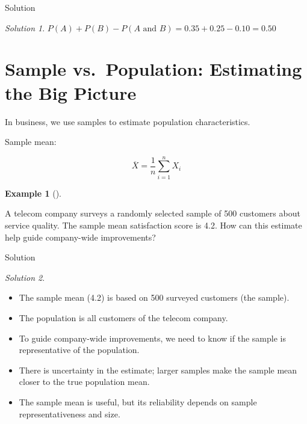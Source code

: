 \documentclass[
  12pt,
  letterpaper,
]{scrbook}
\providecommand{\tightlist}{%
  \setlength{\itemsep}{0pt}\setlength{\parskip}{0pt}}
\renewcommand{\tightlist}{\setlength{\itemsep}{0.5\baselineskip}\setlength{\parskip}{0.2\baselineskip}}
\theoremstyle{definition}
\newtheorem{example}{Example}[chapter]
\theoremstyle{plain}
\theoremstyle{remark}
\newtheorem{refsolution}{Solution}[chapter]
\begin{document}
Solution

\begin{refsolution}
\leavevmode

\(P(A) + P(B) - P(A \text{ and } B) = 0.35 + 0.25 - 0.10 = 0.50\)

\label{sol-2}

\end{refsolution}

\section{Sample vs.~Population: Estimating the Big
Picture}\label{sample-vs.-population-estimating-the-big-picture}

In business, we use samples to estimate population characteristics.

Sample mean:

\[
\overline{X} = \frac{1}{n} \sum_{i=1}^n X_i
\]

\begin{example}[]\protect\hypertarget{exm-telecom}{}\label{exm-telecom}

A telecom company surveys a randomly selected sample of 500 customers
about service quality. The sample mean satisfaction score is 4.2. How
can this estimate help guide company-wide improvements?

\end{example}

Solution

\begin{refsolution}
\leavevmode

\begin{itemize}
\tightlist
\item
  The sample mean (4.2) is based on 500 surveyed customers (the sample).
\item
  The population is all customers of the telecom company.
\item
  To guide company-wide improvements, we need to know if the sample is
  representative of the population.
\item
  There is uncertainty in the estimate; larger samples make the sample
  mean closer to the true population mean.
\item
  The sample mean is useful, but its reliability depends on sample
  representativeness and size.
\end{itemize}

\label{sol-telecom}

\end{refsolution}
\end{document}
